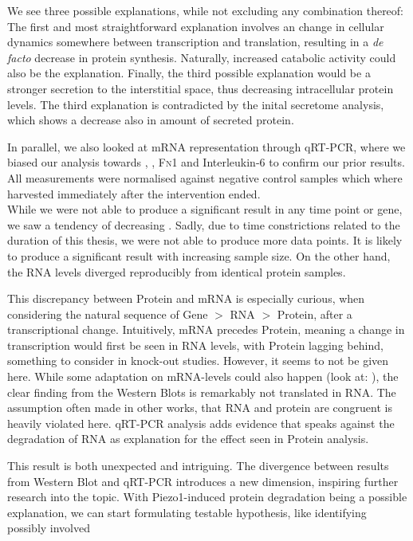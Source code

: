 We see three possible explanations, while not excluding any combination thereof: The first and most straightforward explanation involves an change in cellular dynamics somewhere between transcription and translation, resulting in a \textit{de facto} decrease in protein synthesis. Naturally, increased catabolic activity could also be the explanation. Finally, the third possible explanation would be a stronger secretion to the interstitial space, thus decreasing intracellular protein levels. The third explanation is contradicted by the inital secretome analysis, which shows a decrease also in amount of secreted protein.

In parallel, we also looked at mRNA representation through qRT-PCR, where we biased our analysis towards \colone{ }, \colthree{ }, \textsc{Fn}1 
and Interleukin-6 to confirm our prior results.  All measurements were normalised against negative control samples which where harvested immediately after the intervention ended.\\
While we were not able to produce a significant result in any time point or gene, we saw a tendency of decreasing \colone. Sadly, due to time constrictions related to the duration of this thesis, we were not able to produce more data points. It is likely to produce a significant result with increasing sample size. On the other hand, the RNA levels diverged reproducibly from identical protein samples.

This discrepancy between Protein and mRNA is especially curious, when considering the natural sequence of Gene $>$ RNA $>$ Protein, after a transcriptional change. Intuitively, mRNA precedes Protein, meaning a change in transcription would first be seen in RNA levels, with Protein lagging behind, 
something to consider in knock-out studies. However, it seems to not be given here. While some adaptation on mRNA-levels could also happen (look at:  \colone), the clear finding from the Western Blots is remarkably not translated in RNA. The assumption often made in other works, that RNA and protein are congruent is heavily violated here. qRT-PCR analysis adds evidence that speaks against the degradation of RNA as explanation for the effect seen in Protein analysis. 

This result is both unexpected and intriguing. The divergence between results from Western Blot and qRT-PCR introduces a new dimension, inspiring further research into the topic. With Piezo1-induced protein degradation being a possible explanation, we can start formulating testable hypothesis, like identifying possibly involved 

